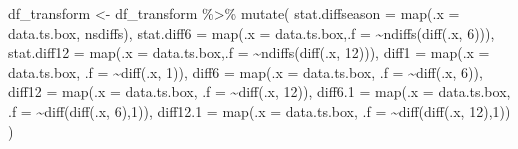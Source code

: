 \documentclass[
  number]{elsarticle}
\newenvironment{Shaded}{\begin{snugshade}}{\end{snugshade}}
\newcommand{\AttributeTok}[1]{\textcolor[rgb]{0.40,0.45,0.13}{#1}}
\newcommand{\DecValTok}[1]{\textcolor[rgb]{0.68,0.00,0.00}{#1}}
\newcommand{\FunctionTok}[1]{\textcolor[rgb]{0.28,0.35,0.67}{#1}}
\newcommand{\NormalTok}[1]{\textcolor[rgb]{0.00,0.23,0.31}{#1}}
\newcommand{\OtherTok}[1]{\textcolor[rgb]{0.00,0.23,0.31}{#1}}
\newcommand{\SpecialCharTok}[1]{\textcolor[rgb]{0.37,0.37,0.37}{#1}}
\begin{document}
\begin{Shaded}
\begin{Highlighting}[]
\NormalTok{df\_transform }\OtherTok{\textless{}{-}}\NormalTok{ df\_transform }\SpecialCharTok{\%\textgreater{}\%} 
    \FunctionTok{mutate}\NormalTok{(}
        \AttributeTok{stat.diffseason =} \FunctionTok{map}\NormalTok{(}\AttributeTok{.x =}\NormalTok{ data.ts.box, nsdiffs),}
        \AttributeTok{stat.diff6 =} \FunctionTok{map}\NormalTok{(}\AttributeTok{.x =}\NormalTok{ data.ts.box,}\AttributeTok{.f =} \SpecialCharTok{\textasciitilde{}}\FunctionTok{ndiffs}\NormalTok{(}\FunctionTok{diff}\NormalTok{(.x, }\DecValTok{6}\NormalTok{))),}
        \AttributeTok{stat.diff12 =} \FunctionTok{map}\NormalTok{(}\AttributeTok{.x =}\NormalTok{ data.ts.box,}\AttributeTok{.f =} \SpecialCharTok{\textasciitilde{}}\FunctionTok{ndiffs}\NormalTok{(}\FunctionTok{diff}\NormalTok{(.x, }\DecValTok{12}\NormalTok{))),}
        \AttributeTok{diff1 =} \FunctionTok{map}\NormalTok{(}\AttributeTok{.x =}\NormalTok{ data.ts.box, }\AttributeTok{.f =} \SpecialCharTok{\textasciitilde{}}\FunctionTok{diff}\NormalTok{(.x, }\DecValTok{1}\NormalTok{)),}
        \AttributeTok{diff6 =} \FunctionTok{map}\NormalTok{(}\AttributeTok{.x =}\NormalTok{ data.ts.box, }\AttributeTok{.f =} \SpecialCharTok{\textasciitilde{}}\FunctionTok{diff}\NormalTok{(.x, }\DecValTok{6}\NormalTok{)),}
        \AttributeTok{diff12 =} \FunctionTok{map}\NormalTok{(}\AttributeTok{.x =}\NormalTok{ data.ts.box, }\AttributeTok{.f =} \SpecialCharTok{\textasciitilde{}}\FunctionTok{diff}\NormalTok{(.x, }\DecValTok{12}\NormalTok{)),}
        \AttributeTok{diff6.1 =} \FunctionTok{map}\NormalTok{(}\AttributeTok{.x =}\NormalTok{ data.ts.box, }\AttributeTok{.f =} \SpecialCharTok{\textasciitilde{}}\FunctionTok{diff}\NormalTok{(}\FunctionTok{diff}\NormalTok{(.x, }\DecValTok{6}\NormalTok{),}\DecValTok{1}\NormalTok{)),}
        \AttributeTok{diff12.1 =} \FunctionTok{map}\NormalTok{(}\AttributeTok{.x =}\NormalTok{ data.ts.box, }\AttributeTok{.f =} \SpecialCharTok{\textasciitilde{}}\FunctionTok{diff}\NormalTok{(}\FunctionTok{diff}\NormalTok{(.x, }\DecValTok{12}\NormalTok{),}\DecValTok{1}\NormalTok{))}
\NormalTok{    )}
\end{Highlighting}
\end{Shaded}
\end{document}
